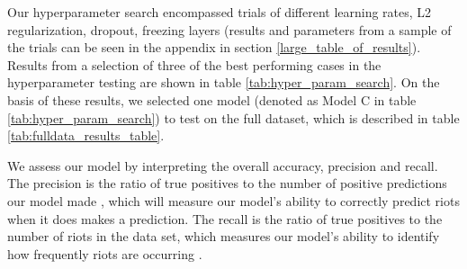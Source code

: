 Our hyperparameter search encompassed trials of different learning rates, L2 regularization, dropout, freezing layers (results and parameters from a sample of the trials can be seen in the appendix in section \ref{large_table_of_results}).  Results from a selection of three of the best performing cases in the hyperparameter testing are shown in table \ref{tab:hyper_param_search}. On the basis of these results, we selected one model (denoted as Model C in table \ref{tab:hyper_param_search}) to test on the full dataset, which is described in table \ref{tab:fulldata_results_table}.
\par
We assess our model by interpreting the overall accuracy, precision and recall.  The precision is the ratio of true positives to the number of positive predictions our model made \citep{davis2006relationship}, which will measure our model's ability to correctly predict riots when it does makes a prediction.  The recall is the ratio of true positives to the number of riots in the data set, which measures our model's ability to identify how frequently riots are occurring \citep{davis2006relationship}.  

\begin{table}
\centering
{}
\caption{Representative results from hyperparameter tuning efforts. All training iterations were based on the same ResNet18 architecture, training with the same 1,000 satellite images from the full dataset, for 40 epochs. }
\label{tab:hyper_param_search}
\end{table}



